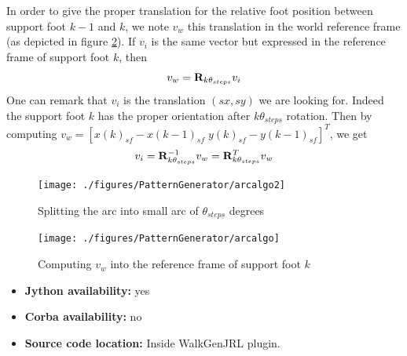 \begin{itemize}
In order to give the proper translation for the relative foot position
between support foot $k-1$ and $k$, we note $v_{w}$ this translation in the
world reference frame (as depicted in figure \ref{pic:ArcAlgo}). 
If $v_{i}$ is the same vector but expressed in the reference frame of support foot $k$,
then 
\begin{equation*}
v_w = {\bf R}_{k \theta_{steps}} v_i
\end{equation*}
One can remark that $v_i$ is the translation $(sx,sy)$ we are looking for.
Indeed the support foot $k$ has the proper orientation after $k \theta_{steps}$ rotation.
Then by computing $v_w = [ x(k)_{sf}-x(k-1)_{sf} \; y(k)_{sf}-y(k-1)_{sf} ]^T$, 
we get 
\begin{equation*}
v_i = {\bf R}^{-1}_{k \theta_{steps}} v_w = {\bf R}^{T}_{k \theta_{steps}} v_w
\end{equation*}


\begin{figure}[htb]
\begin{center}
\texttt{[image: ./figures/PatternGenerator/arcalgo2]}
\caption{Splitting the arc into small arc of $\theta_{steps}$ degrees}
\label{pic:ArcAlgo2}
\end{center}
\end{figure}
\begin{figure}[htb]
\begin{center}
\texttt{[image: ./figures/PatternGenerator/arcalgo]}
\caption{Computing $v_w$ into the reference frame of support foot $k$ }
\label{pic:ArcAlgo}
\end{center}
\end{figure}

\begin{itemize}
\item \textbf{Jython availability:} yes
\item \textbf{Corba availability:} no
\item \textbf{Source code location:} Inside WalkGenJRL plugin.
\end{itemize}


\end{itemize}
